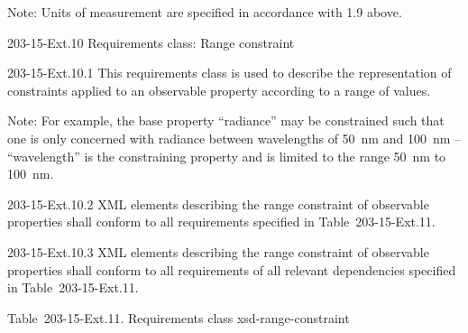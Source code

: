 Note: Units of measurement are specified in accordance with 1.9 above.

203-15-Ext.10 Requirements class: Range constraint

203-15-Ext.10.1 This requirements class is used to describe the representation of constraints applied to an observable property according to a range of values.

Note: For example, the base property ``radiance'' may be constrained such that one is only concerned with radiance between wavelengths of 50~nm and 100~nm -- ``wavelength'' is the constraining property and is limited to the range 50~nm to 100~nm.

203-15-Ext.10.2 XML elements describing the range constraint of observable properties shall conform to all requirements specified in Table~203-15-Ext.11.

203-15-Ext.10.3 XML elements describing the range constraint of observable properties shall conform to all requirements of all relevant dependencies specified in Table~203-15-Ext.11.

Table~203-15-Ext.11. Requirements class xsd-range-constraint

